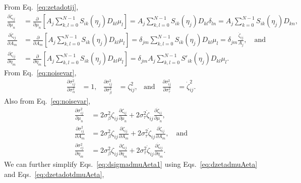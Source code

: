 \documentclass[aps, prb, onecolumn, floatfix, amssymb, superscriptaddress, nofootinbib, longbibliography]{revtex4-2}
\begin{document}
From Eq.~\ref{eq:zetadotij},
\begin{subequations}
\begin{align}
\frac{\partial\dot{\zeta}_{ij}}{\partial\mu_n} &= \frac{\partial}{\partial \mu_n}\left[A_j\sum_{k,l=0}^{N-1} S_{ik}(\eta_j)D_{kl}\mu_{l}\right] = A_j\sum_{k,l=0}^{N-1} S_{ik}(\eta_j)D_{kl}\delta_{ln}= A_j\sum_{k=0}^{N-1} S_{ik}(\eta_j)D_{kn},\\
\frac{\partial\dot{\zeta}_{ij}}{\partial A_m} &= \frac{\partial}{\partial A_m}\left[A_j\sum_{k,l=0}^{N-1} S_{ik}(\eta_j)D_{kl}\mu_{l}\right] = \delta_{jm}\sum_{k,l=0}^{N-1} S_{ik}(\eta_j)D_{kl}\mu_{l} = \delta_{jm}\frac{\dot{\zeta}_{ij}}{A_j},\quad\text{and}\\
\frac{\partial\dot{\zeta}_{ij}}{\partial \eta_m} &= \frac{\partial}{\partial \eta_m}\left[A_j\sum_{k,l=0}^{N-1} S_{ik}(\eta_j)D_{kl}\mu_{l}\right] = \delta_{jm}A_j\sum_{k,l=0}^{N-1} S'_{ik}(\eta_j)D_{kl}\mu_{l}.
\end{align}
\label{eq:dzetadotdmuAeta}
\end{subequations}
From Eq.~\ref{eq:noisevar},
\begin{align}
\frac{\partial\sigma_{ij}^2}{\partial\sigma_\alpha^2} &= 1, &
\frac{\partial\sigma_{ij}^2}{\partial\sigma_\beta^2} &= \zeta_{ij}^2,&\text{and}\quad
\frac{\partial\sigma_{ij}^2}{\partial\sigma_\tau^2} &= \dot{\zeta}_{ij}^2.
\end{align}
Also from Eq.~\ref{eq:noisevar},
\begin{subequations}
\begin{align}
\frac{\partial\sigma_{ij}^2}{\partial \mu_n} &= 2\sigma_\beta^2\zeta_{ij}\frac{\partial\zeta_{ij}}{\partial\mu_n} + 2\sigma_\tau^2\dot{\zeta}_{ij}\frac{\partial\dot{\zeta}_{ij}}{\partial \mu_n},\\
\frac{\partial\sigma_{ij}^2}{\partial A_m} &= 2\sigma_\beta^2\zeta_{ij}\frac{\partial\zeta_{ij}}{\partial A_m} + 2\sigma_\tau^2\dot{\zeta}_{ij}\frac{\partial\dot{\zeta}_{ij}}{\partial A_m},\quad\text{and}\\
\frac{\partial\sigma_{ij}^2}{\partial \eta_m} &= 2\sigma_\beta^2\zeta_{ij}\frac{\partial\zeta_{ij}}{\partial \eta_m} + 2\sigma_\tau^2\dot{\zeta}_{ij}\frac{\partial\dot{\zeta}_{ij}}{\partial \eta_m}.
\end{align}
\label{eq:dsigmadmuAeta1}
\end{subequations}
We can further simplify Eqs.~\ref{eq:dsigmadmuAeta1} using Eqs.~\ref{eq:dzetadmuAeta} and Eqs.~\ref{eq:dzetadotdmuAeta},
\end{document}
